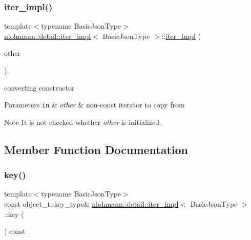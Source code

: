 \subsubsection{\texorpdfstring{iter\+\_\+impl()}{iter\_impl()}\hspace{0.1cm}{\footnotesize\ttfamily [4/4]}}
{\footnotesize\ttfamily template$<$typename Basic\+Json\+Type$>$ \\
\mbox{\hyperlink{classnlohmann_1_1detail_1_1iter__impl}{nlohmann\+::detail\+::iter\+\_\+impl}}$<$ Basic\+Json\+Type $>$\+::\mbox{\hyperlink{classnlohmann_1_1detail_1_1iter__impl}{iter\+\_\+impl}} (\begin{DoxyParamCaption}\item[{const \mbox{\hyperlink{classnlohmann_1_1detail_1_1iter__impl}{iter\+\_\+impl}}$<$ typename std\+::remove\+\_\+const$<$ Basic\+Json\+Type $>$\+::type $>$ \&}]{other }\end{DoxyParamCaption})\hspace{0.3cm}{\ttfamily [inline]}, {\ttfamily [noexcept]}}



converting constructor 


\begin{DoxyParams}[1]{Parameters}
\mbox{\tt in}  & {\em other} & non-\/const iterator to copy from \\
\hline
\end{DoxyParams}
\begin{DoxyNote}{Note}
It is not checked whether {\itshape other} is initialized. 
\end{DoxyNote}


\subsection{Member Function Documentation}
\mbox{\label{classnlohmann_1_1detail_1_1iter__impl_a15dfb2744fed2ef40c12a9e9a20d6dbc}} 
\subsubsection{\texorpdfstring{key()}{key()}}
{\footnotesize\ttfamily template$<$typename Basic\+Json\+Type$>$ \\
const object\+\_\+t\+::key\+\_\+type\& \mbox{\hyperlink{classnlohmann_1_1detail_1_1iter__impl}{nlohmann\+::detail\+::iter\+\_\+impl}}$<$ Basic\+Json\+Type $>$\+::key (\begin{DoxyParamCaption}{ }\end{DoxyParamCaption}) const\hspace{0.3cm}{\ttfamily [inline]}}



